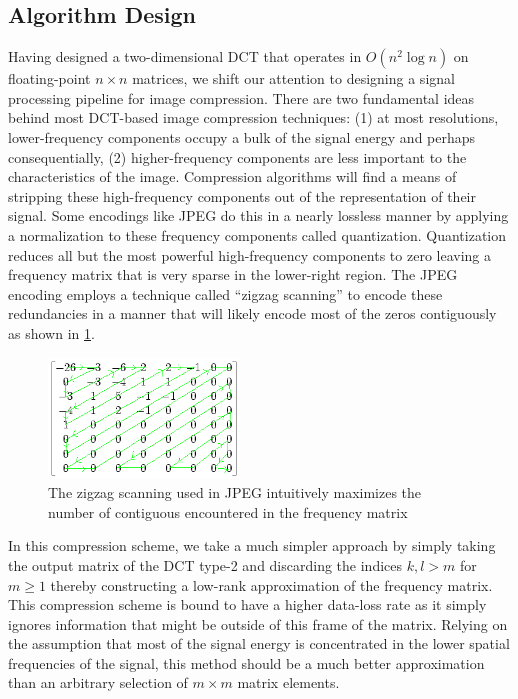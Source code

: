 \documentclass[12pt,technote]{IEEEtran}
\begin{document}
\subsection{Algorithm Design}
Having designed a two-dimensional DCT that operates in $O(n^2\log{n})$ on floating-point $n\times n$ matrices, we shift our attention to designing a signal processing pipeline for image compression. There are two fundamental ideas behind most DCT-based image compression techniques: (1) at most resolutions, lower-frequency components occupy a bulk of the signal energy and perhaps consequentially, (2) higher-frequency components are less important to the characteristics of the image. Compression algorithms will find a means of stripping these high-frequency components out of the representation of their signal. Some encodings like JPEG do this in a nearly lossless manner by applying a normalization to these frequency components called quantization\cite{JPEG1992}. Quantization reduces all but the most powerful high-frequency components to zero leaving a frequency matrix that is very sparse in the lower-right region. The JPEG encoding employs a technique called ``zigzag scanning'' to encode these redundancies in a manner that will likely encode most of the zeros contiguously as shown in \ref{fig:zigzag}.
\begin{figure}[h]
    \begin{center}
        \includegraphics[width=2in]{figures/jpeg_zigzag.png}
    \end{center}
    \caption{The zigzag scanning used in JPEG intuitively maximizes the number of contiguous encountered in the frequency matrix}
    \label{fig:zigzag}
\end{figure}
In this compression scheme, we take a much simpler approach by simply taking the output matrix of the DCT type-2 and discarding the indices $k,l > m$ for $m \geq 1$ thereby constructing a low-rank approximation of the frequency matrix. This compression scheme is bound to have a higher data-loss rate as it simply ignores information that might be outside of this frame of the matrix. Relying on the assumption that most of the signal energy is concentrated in the lower spatial frequencies of the signal, this method should be a much better approximation than an arbitrary selection of $m\times m$ matrix elements.
\end{document}
